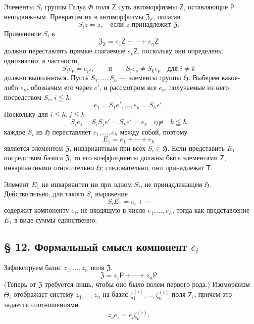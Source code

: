 \documentclass[11pt]{article}
\begin{document}
Элементы \(S_i\) группы Галуа \(\mathfrak G\) поля \(\mathsf Z\) суть автоморфизмы \(\mathsf Z\), оставляющие \(\mathsf P\) неподвижным. Превратим их в автоморфизмы \(\mathfrak Z_{\mathsf Z}\), полагая
\[
S_i z=z,\quad \text{если } z \text{ принадлежит } \mathfrak Z.
\]
Применение \(S_i\) к
\[
\mathfrak Z_{\mathsf Z}=e_1\mathsf Z+\cdots+e_n\mathsf Z
\]
должно переставлять прямые слагаемые \(e_\nu\mathsf Z\), поскольку они определены однозначно; в частности,
\[
S_i e_\nu=e_{\nu'},\qquad\text{и}\qquad S_i e_\nu\ne S_k e_\nu
\quad\text{для } i\ne k
\]
должно выполняться. Пусть \(S_1,\ldots,S_h\) --- элементы группы \(\mathfrak H\). Выберем какое-либо \(e_\nu\), обозначим его через \(e'\), и рассмотрим все \(e_\nu\), получаемые из него посредством \(S_i\), \(i\leqq h\):
\[
e_1=S_1e',\ldots,e_h=S_he'.
\]
Поскольку для \(i\leqq h, j\leqq h\)
\[
S_i e_j=S_iS_j e'=S_ke'=e_k \quad \text{где}\quad k\leqq h
\]
каждое \(S_i\) из \(\mathfrak H\) переставляет \(e_1,\ldots,e_h\) между собой, поэтому
\[
E_1=e_1+\cdots+e_h
\]
является элементом \(\mathfrak Z\), инвариантным при всех \(S_i\in\mathfrak H\). Если представить \(E_1\) посредством базиса \(\mathfrak Z\), то его коэффициенты должны быть элементами \(\mathsf Z\), инвариантными относительно \(\mathfrak H\); следовательно, они принадлежат \(\mathsf T\).

Элемент \(E_1\) не инвариантен ни при одном \(S_i\), не принадлежащем \(\mathfrak H\). Действительно, для такого \(S_i\) выражение
\[
S_i E_1=e_i+\cdots
\]
содержит компоненту \(e_i\), не входящую в число \(e_1,\ldots,e_h\), тогда как представление \(E_1\) в виде суммы единственно.

\subsection*{§ 12. Формальный смысл компонент \(e_i\)}\label{die-formale-bedeutung-der-komponenten-ei}

Зафиксируем базис \(z_1,\ldots,z_n\) поля \(\mathfrak Z\).
\[
\mathfrak Z=z_1\mathsf P+\cdots+z_n\mathsf P
\]
(Теперь от \(\mathfrak Z\) требуется лишь, чтобы оно было полем первого рода.) Изоморфизм \(\Theta_i\) отображает систему \(z_1,\ldots,z_n\) на базис \(\zeta_1^{(i)},\ldots,\zeta_n^{(i)}\) поля \(\mathsf Z_i\), причем это задается соотношениями
\[
z_\nu e_i=e_i\zeta_\nu^{(i)} .
\]
\end{document}
